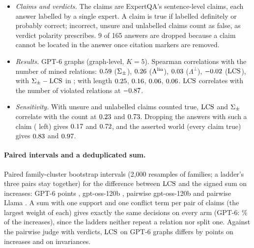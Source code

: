 \begin{itemize}[leftmargin=1.2em,itemsep=1pt,topsep=2pt]
\begin{itemize}[leftmargin=1.2em,itemsep=0pt,topsep=1pt]
  \item \emph{Claims and verdicts.} The claims are ExpertQA's sentence-level claims, each answer
    labelled by a single expert. A claim is true if labelled definitely or probably correct;
    incorrect, unsure and unlabelled claims count as false, as verdict polarity prescribes. 9 of
    165 answers are dropped because a claim cannot be located in the answer once citation markers
    are removed.
  \item \emph{Results.} GPT-6 graphs (graph-level, $K=5$). Spearman correlations with the number of
    mined relations: $0.59$ ($\Sigma_{\pm}$), $0.26$ ($\Lambda^{\mathrm{lin}}$), $0.03$
    ($\Lambda^{\perp}$), $-0.02$ ($\mathrm{LCS}$), with $\Sigma_{\pm}-\mathrm{LCS}$ in
    \asapCI{\dcCountDiffLo}{\dcCountDiffHi}; with length $0.25$, $0.16$,
    $0.06$, $0.06$. $\mathrm{LCS}$ correlates with the number of violated
    relations at $-0.87$.
  \item \emph{Sensitivity.} With unsure and unlabelled claims counted true, $\mathrm{LCS}$ and $\Sigma_{\pm}$ correlate with the
    count at $0.23$ and $0.73$. Dropping the answers with such a claim (\dcCountDropN{} left) gives $0.17$ and
    $0.72$, and the asserted world (every claim true) gives
    $0.83$ and $0.97$.
  \end{itemize}
\end{itemize}

\paragraph{Paired intervals and a deduplicated sum.} Paired family-cluster bootstrap intervals
(2{,}000 resamples of families; a ladder's three pairs stay together) for the difference between
$\mathrm{LCS}$ and the signed sum on increases: GPT-6 \pcLcsWsumIncGpt{} points
\asapCI{\pcLcsWsumIncGptLo}{\pcLcsWsumIncGptHi}, gpt-oss-120b \pcLcsWsumIncOss{}
\asapCI{\pcLcsWsumIncOssLo}{\pcLcsWsumIncOssHi}, pairwise gpt-oss-120b \pcLcsWsumIncPairOss{}
\asapCI{\pcLcsWsumIncPairOssLo}{\pcLcsWsumIncPairOssHi} and pairwise Llama \pcLcsWsumIncPairLlama{}
\asapCI{\pcLcsWsumIncPairLlamaLo}{\pcLcsWsumIncPairLlamaHi}. A sum with one support and one
conflict term per pair of claims (the largest weight of each) gives exactly the same decisions on
every arm (GPT-6: \sThreeGraphGptDsumIncPct\% of the increases), since the ladders neither repeat a
relation nor split one. Against the pairwise judge with verdicts, $\mathrm{LCS}$ on GPT-6 graphs differs by
\pcLcsPairVInc{} points \asapCI{\pcLcsPairVIncLo}{\pcLcsPairVIncHi} on increases and \pcLcsPairVInv{}
\asapCI{\pcLcsPairVInvLo}{\pcLcsPairVInvHi} on invariances.

